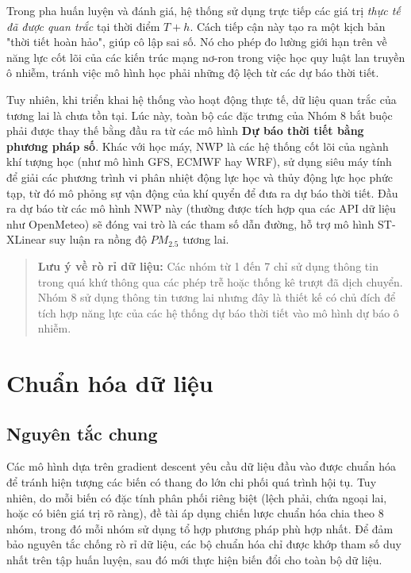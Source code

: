 Trong pha huấn luyện và đánh giá, hệ thống sử dụng trực tiếp các giá trị \textit{thực tế đã được quan trắc} tại thời điểm $T+h$. Cách tiếp cận này tạo ra một kịch bản "thời tiết hoàn hảo", giúp cô lập sai số. Nó cho phép đo lường giới hạn trên về năng lực cốt lõi của các kiến trúc mạng nơ-ron trong việc học quy luật lan truyền ô nhiễm, tránh việc mô hình học phải những độ lệch  từ các dự báo thời tiết.

Tuy nhiên, khi triển khai hệ thống vào hoạt động thực tế, dữ liệu quan trắc của tương lai là chưa tồn tại. Lúc này, toàn bộ các đặc trưng của Nhóm 8 bắt buộc phải được thay thế bằng đầu ra từ các mô hình \textbf{Dự báo thời tiết bằng phương pháp số}. Khác với học máy, NWP là các hệ thống cốt lõi của ngành khí tượng học (như mô hình GFS, ECMWF hay WRF), sử dụng siêu máy tính để giải các phương trình vi phân nhiệt động lực học và thủy động lực học phức tạp, từ đó mô phỏng sự vận động của khí quyển để đưa ra dự báo thời tiết. Đầu ra dự báo từ các mô hình NWP này (thường được tích hợp qua các API dữ liệu như OpenMeteo) sẽ đóng vai trò là các tham số dẫn đường, hỗ trợ mô hình ST-XLinear suy luận ra nồng độ $PM_{2.5}$ tương lai.

\begin{quote}
    \textbf{Lưu ý về rò rỉ dữ liệu:} Các nhóm từ 1 đến 7 chỉ sử dụng thông tin trong quá khứ thông qua các phép trễ hoặc thống kê trượt đã dịch chuyển. Nhóm 8 sử dụng thông tin tương lai nhưng đây là thiết kế có chủ đích để tích hợp năng lực của các hệ thống dự báo thời tiết vào mô hình dự báo ô nhiễm.
\end{quote}
\section{Chuẩn hóa dữ liệu}

\subsection{Nguyên tắc chung}

Các mô hình dựa trên gradient descent yêu cầu dữ liệu đầu vào được chuẩn hóa để tránh hiện tượng các biến có thang đo lớn chi phối quá trình hội tụ. Tuy nhiên, do mỗi biến có đặc tính phân phối riêng biệt (lệch phải, chứa ngoại lai, hoặc có biên giá trị rõ ràng), đề tài áp dụng chiến lược chuẩn hóa chia theo 8 nhóm, trong đó mỗi nhóm sử dụng tổ hợp phương pháp phù hợp nhất. Để đảm bảo nguyên tắc chống rò rỉ dữ liệu, các bộ chuẩn hóa chỉ được khớp tham số duy nhất trên tập huấn luyện, sau đó mới thực hiện biến đổi cho toàn bộ dữ liệu.

